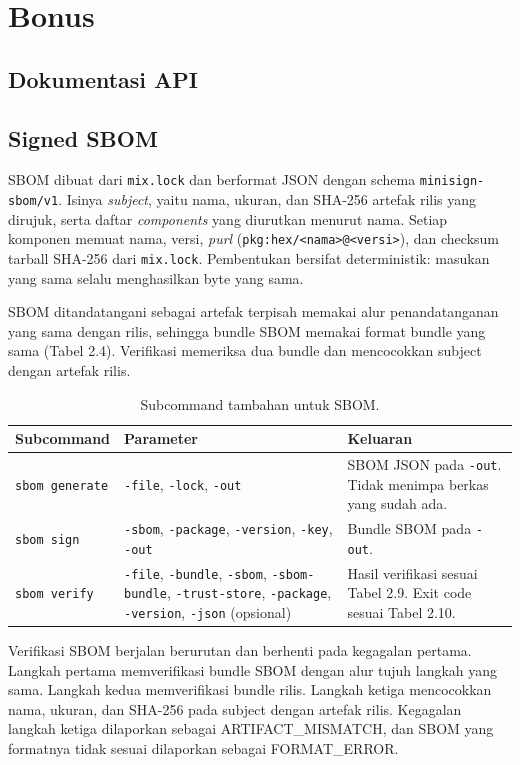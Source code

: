 \section{Bonus}

\subsection{Dokumentasi API}

\subsection{Signed SBOM}

SBOM dibuat dari \texttt{mix.lock} dan berformat JSON dengan schema \texttt{minisign-sbom/v1}.
Isinya \textit{subject}, yaitu nama, ukuran, dan SHA-256 artefak rilis yang dirujuk, serta
daftar \textit{components} yang diurutkan menurut nama. Setiap komponen memuat nama, versi,
\textit{purl} (\texttt{pkg:hex/<nama>@<versi>}), dan checksum tarball SHA-256 dari
\texttt{mix.lock}. Pembentukan bersifat deterministik: masukan yang sama selalu menghasilkan
byte yang sama.

SBOM ditandatangani sebagai artefak terpisah memakai alur penandatanganan yang sama dengan
rilis, sehingga bundle SBOM memakai format bundle yang sama (Tabel 2.4). Verifikasi
memeriksa dua bundle dan mencocokkan subject dengan artefak rilis.

\begin{table}[H]
\centering
\begin{tabular}{@{}llp{7.5cm}@{}}
\toprule
Subcommand & Parameter & Keluaran \\
\midrule
\texttt{sbom generate} & \texttt{-file}, \texttt{-lock}, \texttt{-out} &
SBOM JSON pada \texttt{-out}. Tidak menimpa berkas yang sudah ada. \\
\texttt{sbom sign} & \texttt{-sbom}, \texttt{-package}, \texttt{-version}, \texttt{-key}, \texttt{-out} &
Bundle SBOM pada \texttt{-out}. \\
\texttt{sbom verify} & \texttt{-file}, \texttt{-bundle}, \texttt{-sbom}, \texttt{-sbom-bundle}, \texttt{-trust-store},
\texttt{-package}, \texttt{-version}, \texttt{-json} (opsional) &
Hasil verifikasi sesuai Tabel 2.9. Exit code sesuai Tabel 2.10. \\
\bottomrule
\end{tabular}
\caption{Subcommand tambahan untuk SBOM.}
\end{table}

Verifikasi SBOM berjalan berurutan dan berhenti pada kegagalan pertama. Langkah pertama
memverifikasi bundle SBOM dengan alur tujuh langkah yang sama. Langkah kedua memverifikasi
bundle rilis. Langkah ketiga mencocokkan nama, ukuran, dan SHA-256 pada subject dengan
artefak rilis. Kegagalan langkah ketiga dilaporkan sebagai ARTIFACT\_MISMATCH, dan SBOM yang
formatnya tidak sesuai dilaporkan sebagai FORMAT\_ERROR.

